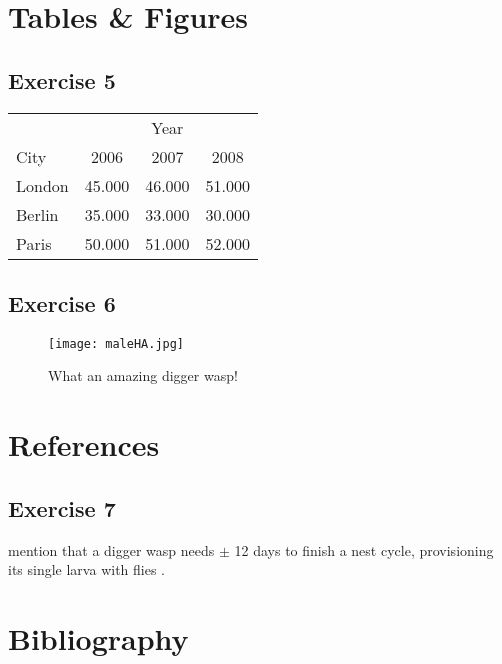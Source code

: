 \documentclass[a4paper,12pt]{article} %
\begin{document}
\section{Tables \& Figures}
\subsection{Exercise 5}
\begin{table}[h]
	\begin{tabular}{l|c c c}
		 & & Year & \\
		 \cline{2-4}
		City & 2006 & 2007 & 2008\\
		\hline
		London & 45.000 & 46.000 & 51.000\\
		Berlin & 35.000 & 33.000 & 30.000\\
		Paris & 50.000 & 51.000 & 52.000\\
	\end{tabular}	
\end{table}

\subsection{Exercise 6}
\begin{figure}[ht]
	\centering
	\texttt{[image: maleHA.jpg]}
	\caption{What an amazing digger wasp!}\label{fig:diggerwasp}
\end{figure}

\section{References}
\subsection{Exercise 7}
\citeauthor{Tengo1996} mention that a digger wasp needs $\pm$ 12 days to finish a nest cycle, provisioning its single larva with flies \citep{Nielsen1945}.

\section{Bibliography}



\end{document}

